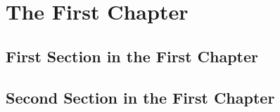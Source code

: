 \documentclass[a4paper, 12pt, oneside]{scrreprt}
\begin{document}
	
	\chapter{The First Chapter}
	\blindtext
	
	
	\section{First Section in the First Chapter}
	\blindtext[2]
	
	\blinditemize
	
	\blindtext
	\begin{quote}
		\blindtext
		
		\blindtext
	\end{quote}
	
	\blindtext
	\begin{quotation}
		\blindtext
		
		\blindtext
	\end{quotation}
	\blindtext
	
	
	\section{Second Section in the First Chapter}
	\Blindtext
	
\end{document}
